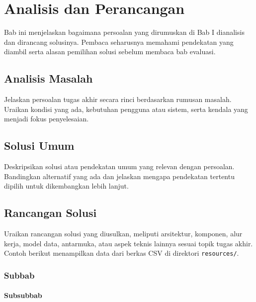 %
%
%
%
%

\chapter{Analisis dan Perancangan}

Bab ini menjelaskan bagaimana persoalan yang dirumuskan di Bab I
dianalisis dan dirancang solusinya. Pembaca seharusnya memahami
pendekatan yang diambil serta alasan pemilihan solusi sebelum
membaca bab evaluasi.

\section{Analisis Masalah}

Jelaskan persoalan tugas akhir secara rinci berdasarkan rumusan
masalah. Uraikan kondisi yang ada, kebutuhan pengguna atau sistem,
serta kendala yang menjadi fokus penyelesaian.

\blindtext

\section{Solusi Umum}

Deskripsikan solusi atau pendekatan umum yang relevan dengan
persoalan. Bandingkan alternatif yang ada dan jelaskan mengapa
pendekatan tertentu dipilih untuk dikembangkan lebih lanjut.

\blindtext

\section{Rancangan Solusi}

Uraikan rancangan solusi yang diusulkan, meliputi arsitektur,
komponen, alur kerja, model data, antarmuka, atau aspek teknis
lainnya sesuai topik tugas akhir. Contoh berikut menampilkan data
dari berkas CSV di direktori \texttt{resources/}.

\begin{table}[ht]
    \centering
    \caption{Kebutuhan fungsional sistem}
    \label{tab:sample-requirements}
\end{table}

\begin{table}[ht]
    \centering
    \caption{Komponen arsitektur sistem}
    \label{tab:sample-components}
\end{table}

    \subsection{Subbab}

    \blindtext

    \subsubsection{Subsubbab}

    \blindtext

\blindtext
